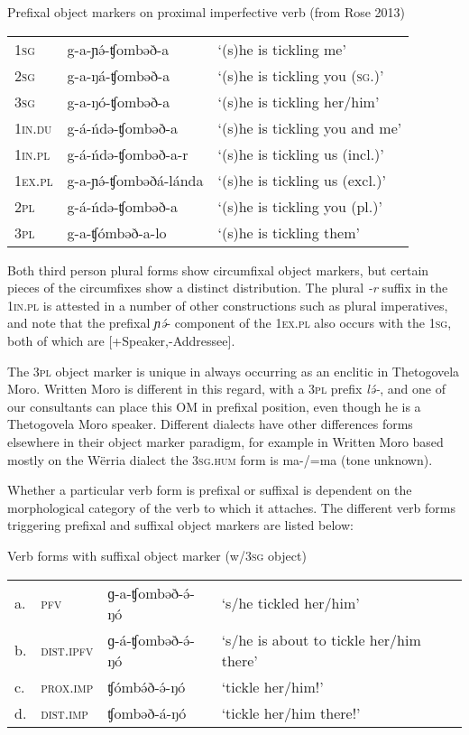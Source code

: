 \ea Prefixal object markers on proximal imperfective verb (from Rose 2013)\\
\begin{tabular}[t]{lll}
1\textsc{sg} & g-a-ɲə́-ʧombəð-a & `(s)he is tickling me'\\
2\textsc{sg} & g-a-ŋá-ʧombəð-a & `(s)he is tickling you (\textsc{sg}.)'\\
3\textsc{sg} & g-a-ŋó-ʧombəð-a & `(s)he is tickling her/him'\\
1\textsc{in}.\textsc{du} & g-á-ńdə-ʧombəð-a & `(s)he is tickling you and me'\\
1\textsc{in}.\textsc{pl} & g-á-ńdə-ʧombəð-a-r & `(s)he is tickling us (incl.)'\\
1\textsc{ex}.\textsc{pl} & g-a-ɲə́-ʧombəðá-lánda & `(s)he is tickling us (excl.)'\\
2\textsc{pl} & g-á-ńdə-ʧombəð-a & `(s)he is tickling you (pl.)'\\
3\textsc{pl} & g-a-ʧómbəð-a-lo & `(s)he is tickling them'\\
\end{tabular}
\z

Both third person plural forms show circumfixal object markers, but certain pieces of the circumfixes show a distinct distribution. The plural \textit{-r} suffix in the 1\textsc{in}.\textsc{pl} is attested in a number of other constructions such as plural imperatives, and note that the prefixal \textit{ɲə́}- component of the 1\textsc{ex}.\textsc{pl} also occurs with the 1\textsc{sg}, both of which are [+Speaker,-Addressee]. 

The 3\textsc{pl} object marker is unique in always occurring as an enclitic in Thetogovela Moro. Written Moro is different in this regard, with a 3\textsc{pl} prefix \textit{lə́-}, and one of our consultants can place this OM in prefixal position, even though he is a Thetogovela Moro speaker. Different dialects have other differences forms elsewhere in their object marker paradigm, for example in Written Moro based mostly on the Wërria dialect the 3\textsc{sg}.\textsc{hum} form is ma-/=ma (tone unknown).

Whether a particular verb form is prefixal or suffixal is dependent on the morphological category of the verb to which it attaches. The different verb forms triggering prefixal and suffixal object markers are listed below:

\ea Verb forms with suffixal object marker (w/3\textsc{sg} object)\\
\begin{tabular}[t]{llll}
a. & \textsc{pfv} 	 &  ɡ-a-ʧombəð-ə́-ŋó	 &  ‘s/he tickled her/him’\\
b. & \textsc{dist.ipfv} &  ɡ-á-ʧombəð-ə́-ŋó & ‘s/he is about to tickle her/him there’\\
c. & \textsc{prox.imp} &  ʧómbə́ð-ə́-ŋó & ‘tickle her/him!’ \\
d. & \textsc{dist.imp} &  ʧombəð-á-ŋó & ‘tickle her/him there!’\\
\end{tabular}		
\z 

